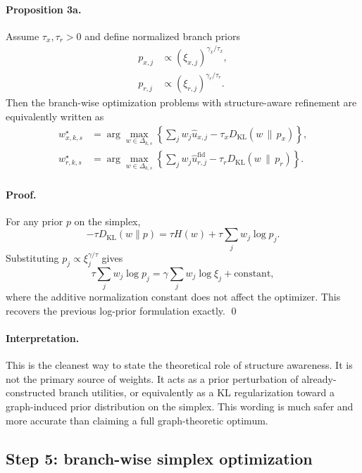 \paragraph{Proposition 3a.}
Assume $\tau_x,\tau_r>0$ and define normalized branch priors
\begin{align}
p_{x,j} &\propto \left(\xi_{x,j}\right)^{\gamma_x/\tau_x}, \\
p_{r,j} &\propto \left(\xi_{r,j}\right)^{\gamma_r/\tau_r}.
\end{align}
Then the branch-wise optimization problems with structure-aware refinement are equivalently written as
\begin{align}
w_{x,k,s}^\star
&=
\arg\max_{w \in \Delta_{k,s}}
\left\{
\sum_j w_j \hat u_{x,j}
- \tau_x D_{\mathrm{KL}}(w \,\|\, p_x)
\right\},
\\
w_{r,k,s}^\star
&=
\arg\max_{w \in \Delta_{k,s}}
\left\{
\sum_j w_j \hat u_{r,j}^{\mathrm{fid}}
- \tau_r D_{\mathrm{KL}}(w \,\|\, p_r)
\right\}.
\end{align}

\paragraph{Proof.}
For any prior $p$ on the simplex,
\begin{equation}
-\tau D_{\mathrm{KL}}(w\|p)
=
\tau H(w) + \tau \sum_j w_j \log p_j.
\end{equation}
Substituting $p_j \propto \xi_j^{\gamma/\tau}$ gives
\begin{equation}
\tau \sum_j w_j \log p_j
=
\gamma \sum_j w_j \log \xi_j + \text{constant},
\end{equation}
where the additive normalization constant does not affect the optimizer. This recovers the previous log-prior formulation exactly. \qed

\paragraph{Interpretation.}
This is the cleanest way to state the theoretical role of structure awareness. It is not the primary source of weights. It acts as a prior perturbation of already-constructed branch utilities, or equivalently as a KL regularization toward a graph-induced prior distribution on the simplex. This wording is much safer and more accurate than claiming a full graph-theoretic optimum.

\subsection*{Step 5: branch-wise simplex optimization}

